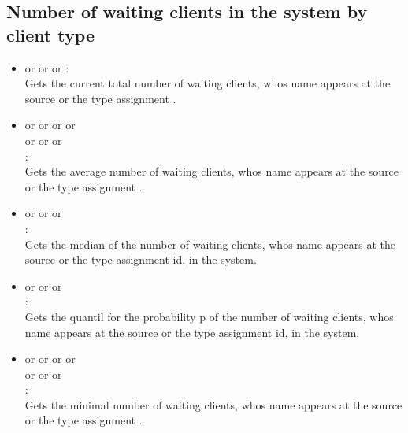 \subsection{Number of waiting clients in the system by client type}

\begin{itemize}    

\item
{} or  or  or :\\
Gets the current total number of waiting clients, whos name appears at the source or the type assignment .

\item
{} or  or  or  or\\
 or  or  or\\
:\\
Gets the average number of waiting clients, whos name appears at the source or the type assignment .

\item
{} or  or  or\\
:\\
Gets the median of the number of waiting clients, whos name appears at the source or the type assignment id, in the system.

\item
{} or  or  or\\
:\\
Gets the quantil for the probability p of the number of waiting clients, whos name appears at the source or the type assignment id, in the system.

\item
{} or  or  or  or\\
 or  or  or\\
:\\
Gets the minimal number of waiting clients, whos name appears at the source or the type assignment .


\end{itemize}
